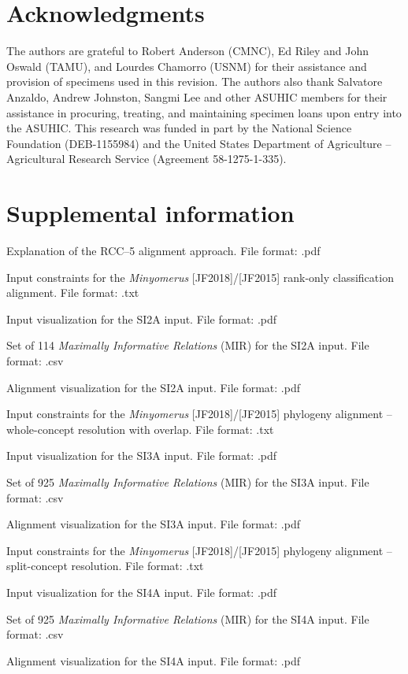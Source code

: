 \documentclass[fleqn,10pt,lineno]{wlpeerj} %
\begin{document}
\section*{Acknowledgments}
	The authors are grateful to Robert Anderson (CMNC), Ed Riley and John Oswald (TAMU), and Lourdes Chamorro (USNM) for their assistance and provision of specimens used in this revision.
	The authors also thank Salvatore Anzaldo, Andrew Johnston, Sangmi Lee and other ASUHIC members for their assistance in procuring, treating, and maintaining specimen loans upon entry into the ASUHIC.
	This research was funded in part by the National Science Foundation (DEB-1155984) and the United States Department of Agriculture – Agricultural Research Service (Agreement 58-1275-1-335).

\section*{Supplemental information}
		\begin{description}[itemsep=-1ex]
			\item[\texttt{SI1}] Explanation of the RCC--5 alignment approach. File format: .pdf
			\item[\texttt{SI2A}] Input constraints for the \textit{Minyomerus} [JF2018]/[JF2015] rank-only classification alignment. File format: .txt
			\item[\texttt{SI2B}] Input visualization for the SI2A input. File format: .pdf
			\item[\texttt{SI2C}] Set of 114 \textit{Maximally Informative Relations} (MIR) for the SI2A input. File format: .csv
			\item[\texttt{SI2D}] Alignment visualization for the SI2A input. File format: .pdf
			\item[\texttt{SI3A}] Input constraints for the \textit{Minyomerus} [JF2018]/[JF2015] phylogeny alignment -- whole-concept resolution with overlap. File format: .txt
			\item[\texttt{SI3B}] Input visualization for the SI3A input. File format: .pdf
			\item[\texttt{SI3C}] Set of 925 \textit{Maximally Informative Relations} (MIR) for the SI3A input. File format: .csv
			\item[\texttt{SI3D}] Alignment visualization for the SI3A input. File format: .pdf
			\item[\texttt{SI4A}] Input constraints for the \textit{Minyomerus} [JF2018]/[JF2015] phylogeny alignment -- split-concept resolution. File format: .txt
			\item[\texttt{SI4B}] Input visualization for the SI4A input. File format: .pdf
			\item[\texttt{SI4C}] Set of 925 \textit{Maximally Informative Relations} (MIR) for the SI4A input. File format: .csv
			\item[\texttt{SI4D}] Alignment visualization for the SI4A input. File format: .pdf
		\end{description}
\end{document}
